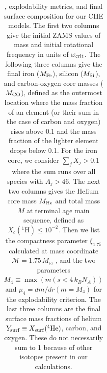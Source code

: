\begin{longtable}{lc|cccc|cc|cc|ccc}
  \caption{\label{tab:explodability}, explodability metrics, and final surface composition  for our CHE models. The first two columns give the initial ZAMS values of mass and initial rotational frequency in units of $\omega_{\rm crit}$. The following three columns give the final iron ($M_{\rm Fe}$), silicon ($M_{\rm Si}$), and carbon-oxygen core masses ($M_{\rm CO}$), defined as the outermost location where the mass fraction of an element (or their sum in the case of carbon and oxygen) rises above 0.1 and the mass fraction of the lighter element drops below 0.1. For the iron core, we consider $\sum_{j} X_{j}>0.1$  where the sum
  runs over all species with $A_{j}>46$. The next two columns
  gives the Helium core mass
  $M_{\rm He}$ and total mass $M$ at terminal age main sequence, defined as $X_{c}(^{1}\mathrm{H})\le10^{-2}$. Then we list the compactness parameter $\xi_{1.75}$ \citep{oconnor:11}
  calculated at mass coordinate $\mathcal{M}=1.75\,M_{\odot}$
  \citep{burrows:24},
  and the two parameters  $M_{4}\equiv\max(m(s<4\,k_{B}N_{A}))$ and  $\mu_{4}=dm/dr(m=M_{4})$
  for the \cite{ertl:16, ertl:20} explodability criterion. The last three columns are the final surface mass
  fractions of helium
  $Y_{\rm surf}\equiv X_{\rm surf}(^{4}\mathrm{He})$, carbon, and
  oxygen. These do not necessarily sum to 1 because of other isotopes
  present in our calculations.}\\


\end{longtable}
